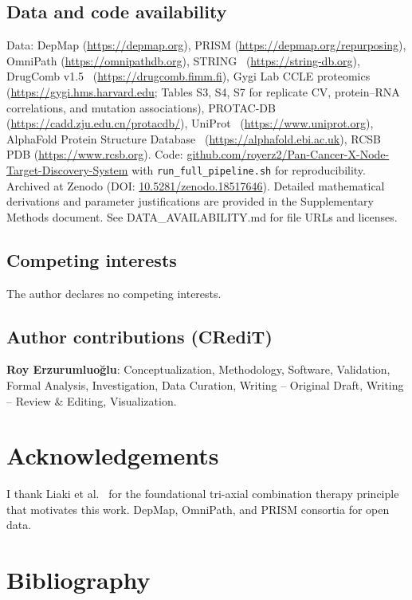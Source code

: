 \documentclass[times, twoside, watermark]{zHenriquesLab-StyleBioRxiv}
\newenvironment{acknowledgements}{\section*{Acknowledgements}}{}
\begin{document}
\subsection*{Data and code availability}
Data: DepMap (\url{https://depmap.org}), PRISM (\url{https://depmap.org/repurposing}), OmniPath (\url{https://omnipathdb.org}), STRING~\cite{Szklarczyk2025} (\url{https://string-db.org}), DrugComb v1.5~\cite{Zagidullin2019,Zheng2022} (\url{https://drugcomb.fimm.fi}), Gygi Lab CCLE proteomics~\cite{Nusinow2020} (\url{https://gygi.hms.harvard.edu}; Tables S3, S4, S7 for replicate CV, protein--RNA correlations, and mutation associations), PROTAC-DB~\cite{Weng2021} (\url{https://cadd.zju.edu.cn/protacdb/}), UniProt~\cite{UniProt2023} (\url{https://www.uniprot.org}), AlphaFold Protein Structure Database~\cite{Jumper2021} (\url{https://alphafold.ebi.ac.uk}), RCSB PDB (\url{https://www.rcsb.org}).
Code: \href{https://github.com/royerz2/Pan-Cancer-X-Node-Target-Discovery-System}{github.com/royerz2/Pan-Cancer-X-Node-Target-Discovery-System} with \texttt{run\_full\_pipeline.sh} for reproducibility.
Archived at Zenodo (DOI: \href{https://doi.org/10.5281/zenodo.18517646}{10.5281/zenodo.18517646}).
Detailed mathematical derivations and parameter justifications are provided in the Supplementary Methods document. See DATA\_AVAILABILITY.md for file URLs and licenses.

\subsection*{Competing interests}
The author declares no competing interests.

\subsection*{Author contributions (CRediT)}
\textbf{Roy Erzurumluoğlu}: Conceptualization, Methodology, Software, Validation, Formal Analysis, Investigation, Data Curation, Writing -- Original Draft, Writing -- Review \& Editing, Visualization.

\begin{acknowledgements}
I thank Liaki et al.~\cite{Liaki2025} for the foundational tri-axial combination therapy principle that motivates this work. DepMap, OmniPath, and PRISM consortia for open data.
\end{acknowledgements}

\section*{Bibliography}
\end{document}
